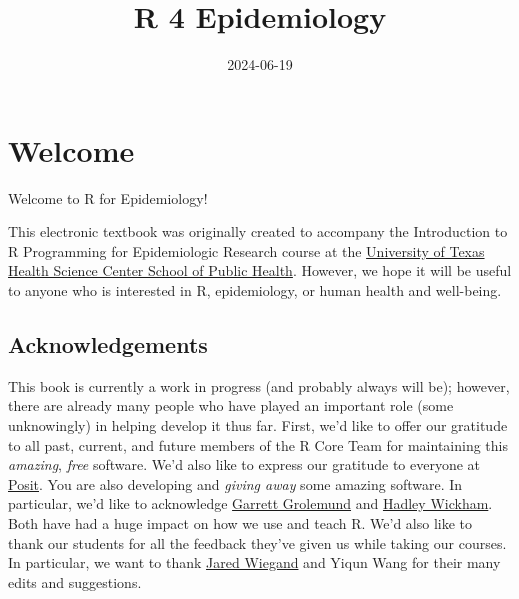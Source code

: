 \documentclass[
  letterpaper,
  DIV=11,
  numbers=noendperiod]{scrreprt}
\title{R 4 Epidemiology}
\author{}
\date{2024-06-19}
\renewcommand*\contentsname{Table of contents}
\newcommand\contentsname{Table of contents}
\begin{document}
\maketitle

\renewcommand*\contentsname{Table of contents}
{
\hypersetup{linkcolor=}
\setcounter{tocdepth}{2}
\tableofcontents
}

\chapter*{Welcome}\label{welcome}


Welcome to R for Epidemiology!

This electronic textbook was originally created to accompany the
Introduction to R Programming for Epidemiologic Research course at the
\href{https://sph.uth.edu/}{University of Texas Health Science Center
School of Public Health}. However, we hope it will be useful to anyone
who is interested in R, epidemiology, or human health and well-being.

\section*{Acknowledgements}\label{acknowledgements}


This book is currently a work in progress (and probably always will be);
however, there are already many people who have played an important role
(some unknowingly) in helping develop it thus far. First, we'd like to
offer our gratitude to all past, current, and future members of the R
Core Team for maintaining this \emph{amazing}, \emph{free} software.
We'd also like to express our gratitude to everyone at
\href{https://posit.co/}{Posit}. You are also developing and
\emph{giving away} some amazing software. In particular, we'd like to
acknowledge
\href{https://www.linkedin.com/in/garrett-grolemund-49328411/}{Garrett
Grolemund} and \href{https://hadley.nz/}{Hadley Wickham}. Both have had
a huge impact on how we use and teach R. We'd also like to thank our
students for all the feedback they've given us while taking our courses.
In particular, we want to thank
\href{https://www.linkedin.com/in/jared-wiegand/}{Jared Wiegand} and
Yiqun Wang for their many edits and suggestions.
\end{document}
